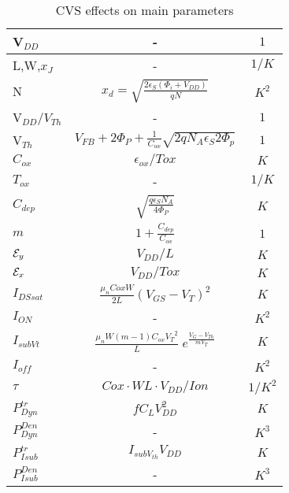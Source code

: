\documentclass[a4paper, 12pt, twoside, openright]{report}
\begin{document}
\begin{enumerate}
 \begin{center}
     \begin{longtable}{||l||c|c||} \caption{CVS effects on main parameters}\\ \hline \label{cvs}
      V$_{DD}$ & -& $ {1}$\\
      \hline
      L,W,$x_J$       &- & $ {1/K}$\\
      \hline
      N & $x_d=\sqrt{\frac{2\epsilon_S(\Phi_i+V_{DD})}{qN}}$&$ {K^2}$ \\
      \hline
      V$_{DD}/V_{Th}$ &- & ${1}$\\
      \hline
      V$_{Th}$ & $V_{FB}+2\Phi_P+\frac{1}{C_{ox}}\sqrt{2qN_A\epsilon_S 2\Phi_p}$& $ {1}$\\
      \hline
       $C_{ox}$&  $\epsilon_{ox}/Tox$ &$ {K}$\\ 
      \hline
      $T_{ox}$       &- & $ {1/K}$\\
      \hline
       $C_{dep}$&  $\sqrt{\frac{q\epsilon_SN_A}{4\Phi_P}}$ & ${K}$\\
      \hline
       $m$&  $1 +\frac{C_{dep}}{C_{ox}}$ &$ {1}$\\ 
      \hline
      ${\cal E}_y$ & $V_{DD}/L$ & $ {K}$\\
      \hline
      ${\cal E}_x$ & $V_{DD}/Tox$ & $ {K}$\\
      \hline
      $I_{DSsat}$      &$\frac{\mu_n Cox W}{2L}(V_{GS}-V_T)^2$ &$ {K}$\\ 
      \hline  
       $I_{ON}$      &- &$ {K}^2$\\ 
      \hline
       $I_{subVt}$      &$\frac{\mu_n W \left(m-1 \right) C_{ox} {V_T}^2}{L}\;
            e^{\displaystyle \frac{ {V_G-V_{Th}}}{ mV_T}}$ &$ {K}$\\ 
      \hline  
       $I_{off}$      &- &$ {K}^2$\\ 
      \hline
      $\tau$     &$Cox\cdot WL\cdot V_{DD}/Ion$ &$ {1/K^2}$\\ 
      \hline 
      $P_{Dyn}^{tr}$      &$fC_LV_{DD}^2$  &$ {K}$\\ 
      \hline 
      $P_{Dyn}^{Den}$      &-&$ {K^3}$\\ 
      \hline
       $P_{Isub}^{tr}$      &$I_{subV_{th}}V_{DD}$  &$ {K}$\\ 
      \hline 
       $P_{Isub}^{Den}$      &-&$ {K^3}$\\ 
      \hline
     \end{longtable}
    \end{center}


\end{enumerate}
\end{document}
